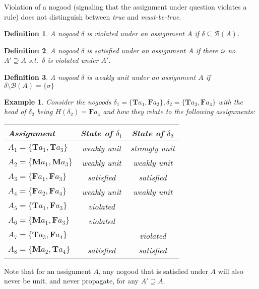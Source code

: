 \documentclass[final]{vutinfth} %
\newtheorem{example}{Example}[chapter]
\newtheorem{definition}{Definition}[chapter]
\newcommand{\mbt}{must-be-true\xspace}
\newcommand{\bass}{\mathcal{B}}
\newcommand{\ass}{A}
\newcommand{\bT}{\mathbf{T}}
\newcommand{\bM}{\mathbf{M}}
\newcommand{\bF}{\mathbf{F}}
\newcommand{\headf}{H}
\newcommand{\bsgl}{\sigma}
\begin{document}
Violation of a nogood (signaling that the assignment under question violates a rule) does not distinguish between \emph{true} and \emph{\mbt}.

\begin{definition}
\label{def:vio}
A nogood $\delta$ is \emph{violated} under an assignment $\ass$ if $\delta \subseteq \bass(\ass)$.
\end{definition}

\begin{definition}
A nogood $\delta$ is \emph{satisfied} under an assignment $\ass$ if there is no $\ass' \supseteq \ass$ s.t.~$\delta$ is violated under $\ass'$.
\end{definition}

\begin{definition}
A nogood $\delta$ is \emph{weakly unit} under an assignment $\ass$ if $\delta \setminus \bass(\ass) = \{ \bsgl \}$
\end{definition}

\begin{example}
Consider the nogoods $\delta_1 = \{ \bT a_1, \bF a_2 \}, \delta_2 = \{ \bT a_3, \bF a_4 \}$ with the head of $\delta_2$ being $\headf(\delta_2) = \bF a_4$ and how they relate to the following assignments:
\begin{center}

\begin{tabular}{|l||c|c|}
\hline
Assignment & State of $\delta_1$ & State of $\delta_2$ \\
\hline\hline
$\ass_1 = \{ \bT a_1, \bT a_3 \}$ & weakly unit & strongly unit\\
$\ass_2 = \{ \bM a_1, \bM a_3 \}$ & weakly unit & weakly unit\\
$\ass_3 = \{ \bF a_1, \bF a_3 \}$ & satisfied & satisfied \\
$\ass_4 = \{ \bF a_2, \bF a_4 \}$ & weakly unit & weakly unit\\
$\ass_5 = \{ \bT a_1, \bF a_3 \}$ & violated & \\
$\ass_6 = \{ \bM a_1, \bF a_3 \}$ & violated & \\
$\ass_7 = \{ \bT a_3, \bF a_4 \}$ & & violated  \\
$\ass_8 = \{ \bM a_2, \bT a_4 \}$ & satisfied & satisfied \\
\hline
\end{tabular}
\end{center}
\end{example}

Note that for an assignment $\ass$, any nogood that is satisfied under $\ass$ will also never be unit, and never propagate, for any $\ass' \supseteq \ass$.
\end{document}
